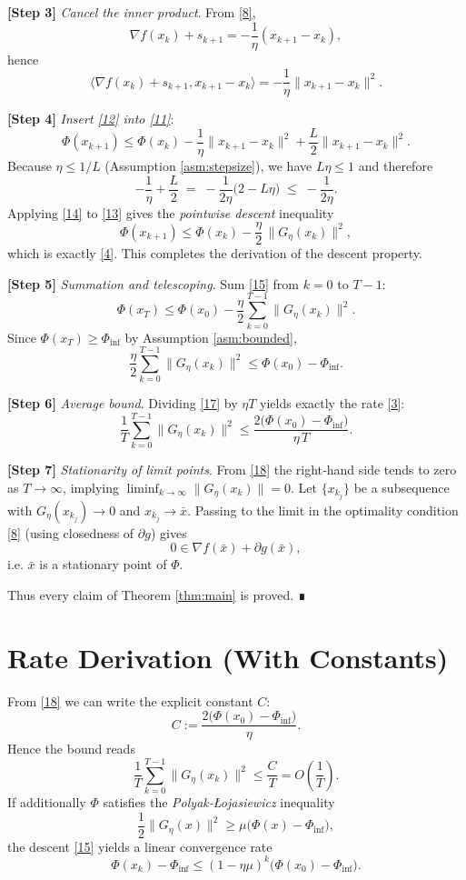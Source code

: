 \documentclass{article}
\begin{document}
\noindent\textbf{[Step 3]}  \emph{Cancel the inner product}.  
From \eqref{8},
\[
\nabla f(x_{k})+s_{k+1}
= -\frac{1}{\eta}(x_{k+1}-x_{k}),
\]
hence
\[
\langle\nabla f(x_{k})+s_{k+1},x_{k+1}-x_{k}\rangle
= -\frac{1}{\eta}\|x_{k+1}-x_{k}\|^{2}.
\tag{12}
\]

\noindent\textbf{[Step 4]}  \emph{Insert \eqref{12} into \eqref{11}}:
\[
\Phi(x_{k+1})
\le \Phi(x_{k})-\frac{1}{\eta}\|x_{k+1}-x_{k}\|^{2}
+\frac{L}{2}\|x_{k+1}-x_{k}\|^{2}.
\tag{13}
\]
Because $\eta\le 1/L$ (Assumption \ref{asm:stepsize}), we have $L\eta\le1$ and therefore
\[
-\frac{1}{\eta}+\frac{L}{2}
\;=\;
-\frac{1}{2\eta}\bigl(2-L\eta\bigr)
\;\le\;
-\frac{1}{2\eta}.
\tag{14}
\]
Applying \eqref{14} to \eqref{13} gives the \emph{pointwise descent} inequality
\[
\Phi(x_{k+1})
\le \Phi(x_{k})-\frac{\eta}{2}\,\big\|G_{\eta}(x_{k})\big\|^{2},
\tag{15}
\]
which is exactly \eqref{4}.  This completes the derivation of the descent property.

\noindent\textbf{[Step 5]}  \emph{Summation and telescoping}.  
Sum \eqref{15} from $k=0$ to $T-1$:
\[
\Phi(x_{T})\le \Phi(x_{0})-\frac{\eta}{2}\sum_{k=0}^{T-1}\|G_{\eta}(x_{k})\|^{2}.
\tag{16}
\]
Since $\Phi(x_{T})\ge\Phi_{\inf}$ by Assumption \ref{asm:bounded},
\[
\frac{\eta}{2}\sum_{k=0}^{T-1}\|G_{\eta}(x_{k})\|^{2}
\le \Phi(x_{0})-\Phi_{\inf}.
\tag{17}
\]

\noindent\textbf{[Step 6]}  \emph{Average bound}.  
Dividing \eqref{17} by $\eta T$ yields exactly the rate \eqref{3}:
\[
\frac{1}{T}\sum_{k=0}^{T-1}\|G_{\eta}(x_{k})\|^{2}
\le\frac{2\big(\Phi(x_{0})-\Phi_{\inf}\big)}{\eta\,T}.
\tag{18}
\]

\noindent\textbf{[Step 7]}  \emph{Stationarity of limit points}.  
From \eqref{18} the right‑hand side tends to zero as $T\to\infty$, implying $\liminf_{k\to\infty}\|G_{\eta}(x_{k})\|=0$.  Let $\{x_{k_{j}}\}$ be a subsequence with $G_{\eta}(x_{k_{j}})\to0$ and $x_{k_{j}}\to\bar x$.  Passing to the limit in the optimality condition \eqref{8} (using closedness of $\partial g$) gives
\[
0\in\nabla f(\bar x)+\partial g(\bar x),
\]
i.e. $\bar x$ is a stationary point of $\Phi$.

Thus every claim of Theorem \ref{thm:main} is proved.  ∎

\section*{Rate Derivation (With Constants)}
From \eqref{18} we can write the explicit constant $C$:
\[
C:=\frac{2\big(\Phi(x_{0})-\Phi_{\inf}\big)}{\eta}.
\]
Hence the bound reads
\[
\frac{1}{T}\sum_{k=0}^{T-1}\|G_{\eta}(x_{k})\|^{2}\le\frac{C}{T}=O\!\left(\frac{1}{T}\right).
\]
If additionally $\Phi$ satisfies the {\it Polyak‑Łojasiewicz} inequality
\[
\frac{1}{2}\|G_{\eta}(x)\|^{2}\ge\mu\big(\Phi(x)-\Phi_{\inf}\big),
\]
the descent \eqref{15} yields a linear convergence rate
\[
\Phi(x_{k})-\Phi_{\inf}\le (1-\eta\mu)^{k}\big(\Phi(x_{0})-\Phi_{\inf}\big).
\]
\end{document}
